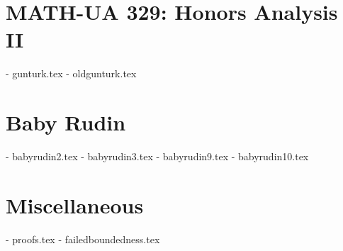 \section{MATH-UA 329: Honors Analysis II}
- gunturk.tex
- oldgunturk.tex

\section{Baby Rudin}
- babyrudin2.tex
- babyrudin3.tex
- babyrudin9.tex
- babyrudin10.tex

\section{Miscellaneous}
- proofs.tex
- failedboundedness.tex
